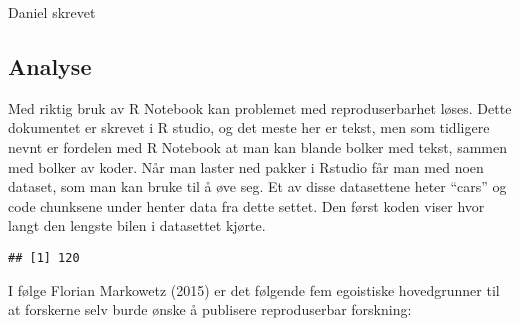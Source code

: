 \documentclass[
  12pt,
]{article}
\newenvironment{Shaded}{\begin{snugshade}}{\end{snugshade}}
\newcommand{\FunctionTok}[1]{\textcolor[rgb]{0.00,0.00,0.00}{#1}}
\newcommand{\NormalTok}[1]{#1}
\newcommand{\SpecialCharTok}[1]{\textcolor[rgb]{0.00,0.00,0.00}{#1}}
\begin{document}
Daniel skrevet

\hypertarget{analyse}{%
\subsection{Analyse}\label{analyse}}

Med riktig bruk av R Notebook kan problemet med reproduserbarhet løses.
Dette dokumentet er skrevet i R studio, og det meste her er tekst, men
som tidligere nevnt er fordelen med R Notebook at man kan blande bolker
med tekst, sammen med bolker av koder. Når man laster ned pakker i
Rstudio får man med noen dataset, som man kan bruke til å øve seg. Et av
disse datasettene heter ``cars'' og code chunksene under henter data fra
dette settet. Den først koden viser hvor langt den lengste bilen i
datasettet kjørte.

\begin{Shaded}
\end{Shaded}

\begin{verbatim}
## [1] 120
\end{verbatim}

I følge Florian Markowetz (2015) er det følgende fem egoistiske
hovedgrunner til at forskerne selv burde ønske å publisere reproduserbar
forskning:
\end{document}
